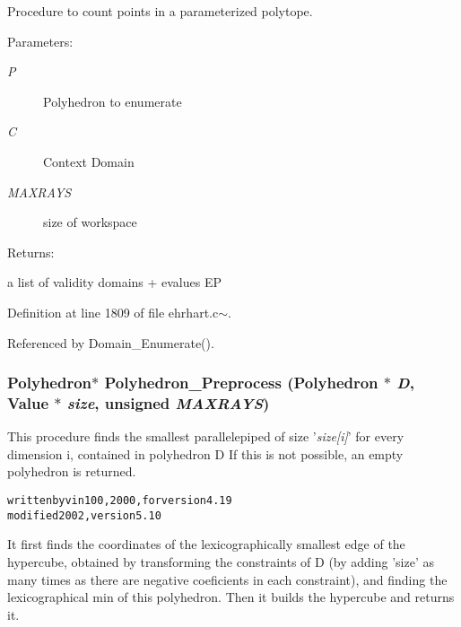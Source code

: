 Procedure to count points in a parameterized polytope.

\begin{Desc}
\item[Parameters: ]\par
\begin{description}
\item[{\em 
P}]Polyhedron to enumerate \item[{\em 
C}]Context Domain \item[{\em 
MAXRAYS}]size of workspace \end{description}
\end{Desc}
\begin{Desc}
\item[Returns: ]\par
a list of validity domains + evalues EP \end{Desc}


Definition at line 1809 of file ehrhart.c$\sim$.

Referenced by Domain\_\-Enumerate().

\subsubsection{\setlength{\rightskip}{0pt plus 5cm}Polyhedron$\ast$ Polyhedron\_\-Preprocess (Polyhedron $\ast$ {\em D}, Value $\ast$ {\em size}, unsigned {\em MAXRAYS})}\label{ehrhart_8c~_a20}


This procedure finds the smallest parallelepiped of size '{\em size[i]}' for every dimension i, contained in polyhedron D If this is not possible, an empty polyhedron is returned.





\small\begin{alltt}
written by vin100, 2000, for version 4.19
modified 2002, version 5.10
\end{alltt}\normalsize 






It first finds the coordinates of the lexicographically smallest edge of the hypercube, obtained by transforming the constraints of D (by adding 'size' as many times as there are negative coeficients in each constraint), and finding the lexicographical min of this polyhedron. Then it builds the hypercube and returns it.



